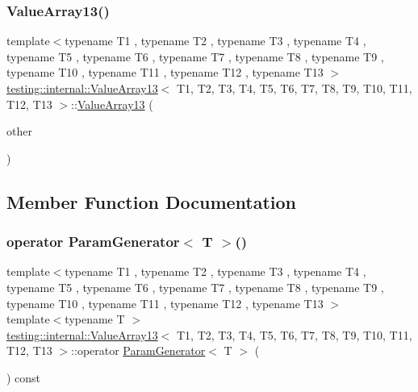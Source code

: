 \subsubsection{\texorpdfstring{ValueArray13()}{ValueArray13()}\hspace{0.1cm}{\footnotesize\ttfamily [2/2]}}
{\footnotesize\ttfamily template$<$typename T1 , typename T2 , typename T3 , typename T4 , typename T5 , typename T6 , typename T7 , typename T8 , typename T9 , typename T10 , typename T11 , typename T12 , typename T13 $>$ \\
\mbox{\hyperlink{classtesting_1_1internal_1_1ValueArray13}{testing\+::internal\+::\+Value\+Array13}}$<$ T1, T2, T3, T4, T5, T6, T7, T8, T9, T10, T11, T12, T13 $>$\+::\mbox{\hyperlink{classtesting_1_1internal_1_1ValueArray13}{Value\+Array13}} (\begin{DoxyParamCaption}\item[{const \mbox{\hyperlink{classtesting_1_1internal_1_1ValueArray13}{Value\+Array13}}$<$ T1, T2, T3, T4, T5, T6, T7, T8, T9, T10, T11, T12, T13 $>$ \&}]{other }\end{DoxyParamCaption})\hspace{0.3cm}{\ttfamily [inline]}}



\subsection{Member Function Documentation}
\mbox{\label{classtesting_1_1internal_1_1ValueArray13_a80572fc9c66a20824ae0934785b41f24}} 
\subsubsection{\texorpdfstring{operator ParamGenerator$<$ T $>$()}{operator ParamGenerator< T >()}}
{\footnotesize\ttfamily template$<$typename T1 , typename T2 , typename T3 , typename T4 , typename T5 , typename T6 , typename T7 , typename T8 , typename T9 , typename T10 , typename T11 , typename T12 , typename T13 $>$ \\
template$<$typename T $>$ \\
\mbox{\hyperlink{classtesting_1_1internal_1_1ValueArray13}{testing\+::internal\+::\+Value\+Array13}}$<$ T1, T2, T3, T4, T5, T6, T7, T8, T9, T10, T11, T12, T13 $>$\+::operator \mbox{\hyperlink{classtesting_1_1internal_1_1ParamGenerator}{Param\+Generator}}$<$ T $>$ (\begin{DoxyParamCaption}{ }\end{DoxyParamCaption}) const\hspace{0.3cm}{\ttfamily [inline]}}



